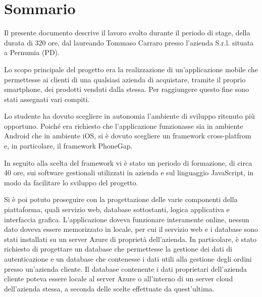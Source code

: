 
\cleardoublepage
{}
{}
\begingroup
\let\clearpage\relax
\let\cleardoublepage\relax
\let\cleardoublepage\relax

\chapter*{Sommario}

Il presente documento descrive il lavoro svolto durante il periodo di stage, della durata di 320 ore, dal laureando Tommaso Carraro presso l'azienda \visione{} S.r.l. situata a Pernumia (PD).

Lo scopo principale del progetto era la realizzazione di un'applicazione mobile che permettesse ai clienti di una qualsiasi azienda di acquistare, tramite il proprio smartphone, dei prodotti venduti dalla stessa. Per raggiungere questo fine sono stati assegnati vari compiti.

Lo studente ha dovuto scegliere in autonomia l'ambiente di sviluppo ritenuto più opportuno. Poiché era richiesto che l'applicazione funzionasse sia in ambiente Android che in ambiente iOS, si è dovuto scegliere un framework cross-platfrom e, in particolare, il framework PhoneGap.

In seguito alla scelta del framework vi è stato un periodo di formazione, di circa 40 ore, sui software gestionali utilizzati in azienda e sul linguaggio JavaScript, in modo da facilitare lo sviluppo del progetto.

Si è poi potuto proseguire con la progettazione delle varie componenti della piattaforma, quali servizio web, database sottostanti, logica applicativa e interfaccia grafica. 
L'applicazione doveva funzionare interamente online, nessun dato doveva essere memorizzato in locale, per cui il servizio web e i database sono stati installati su un server Azure di proprietà dell'azienda.
In particolare, è stato richiesto di progettare un database che permettesse la gestione dei dati di autenticazione e un database che contenesse i dati utili alla gestione degli ordini presso un'azienda cliente. Il database contenente i dati proprietari dell'azienda cliente poteva essere locale al server Azure o all'interno di un server cloud dell'azienda stessa, a seconda delle scelte effettuate da quest'ultima.

